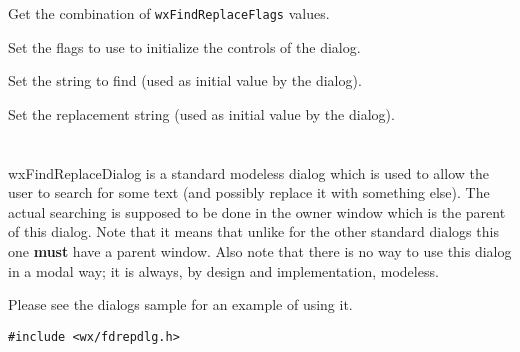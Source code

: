 
Get the combination of {\tt wxFindReplaceFlags} values.

\label{wxfindreplacedatasetflags}


Set the flags to use to initialize the controls of the dialog.

\label{wxfindreplacedatasetfindstring}


Set the string to find (used as initial value by the dialog).

\label{wxfindreplacedatasetreplacestring}


Set the replacement string (used as initial value by the dialog).

\section{}\label{wxfindreplacedialog}

wxFindReplaceDialog is a standard modeless dialog which is used to allow the
user to search for some text (and possibly replace it with something else).
The actual searching is supposed to be done in the owner window which is the
parent of this dialog. Note that it means that unlike for the other standard
dialogs this one {\bf must} have a parent window. Also note that there is no
way to use this dialog in a modal way; it is always, by design and
implementation, modeless.

Please see the dialogs sample for an example of using it.


\begin{verbatim}
#include <wx/fdrepdlg.h>
\end{verbatim}




\label{wxfindreplacedialogctor}


